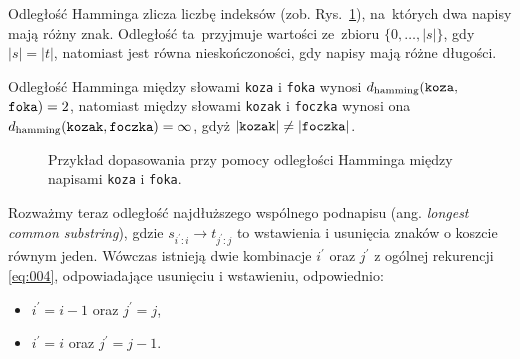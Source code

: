 \documentclass{praca1}
\begin{document}
Odległość Hamminga zlicza liczbę indeksów (zob. Rys.~\ref{rys:002}), na~których dwa napisy mają różny znak. Odległość ta~przyjmuje wartości ze~zbioru $\{0,\ldots,|s|\}$, gdy $|s|=|t|$, natomiast jest równa nieskończoności, gdy napisy mają różne długości.

\begin{example}
Odległość Hamminga między słowami \verb|koza| i \verb|foka| wynosi $d_{\mathrm{hamming}}(\verb|koza|,$ $\verb|foka|) = 2$, natomiast między słowami \verb|kozak| i \verb|foczka| wynosi ona $d_{\mathrm{hamming}}(\verb|kozak|, \verb|foczka|) = \infty$, gdyż $|\verb|kozak| | \neq | \verb|foczka| |$.
\end{example}

\begin{figure}[width=80pt]
\centering
{}
\cprotect\caption{Przykład dopasowania przy pomocy odległości Hamminga między napisami \verb|koza| i \verb|foka|.}\label{rys:002}
\end{figure}



Rozważmy teraz odległość najdłuższego wspólnego podnapisu (ang. \emph{longest common substring}), gdzie $s_{i^\prime:i}\rightarrow t_{j^\prime:j}$ to wstawienia i usunięcia znaków o koszcie równym jeden. Wówczas istnieją dwie kombinacje $i^\prime$ oraz $j^\prime$ z ogólnej rekurencji \eqref{eq:004}, odpowiadające usunięciu i wstawieniu, odpowiednio:
\begin{itemize}
\item $i^\prime = i - 1$ oraz $j^\prime = j$,
\item $i^\prime = i$ oraz $j^\prime = j - 1$.
\end{itemize}
\end{document}
